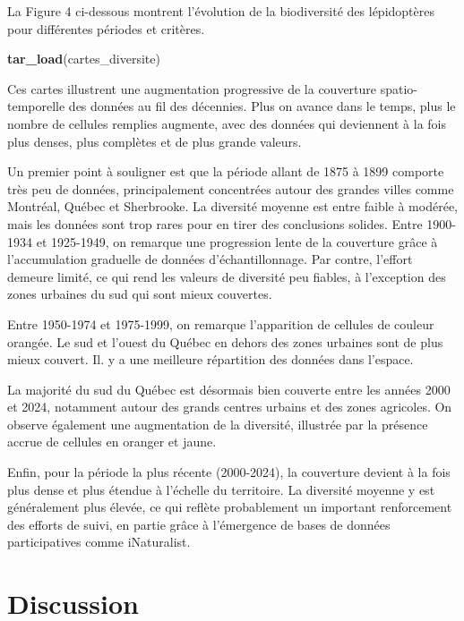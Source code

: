 \documentclass[9pt,twocolumn,twoside,]{pnas-new}
\newenvironment{Shaded}{\begin{snugshade}}{\end{snugshade}}
\newcommand{\FunctionTok}[1]{\textcolor[rgb]{0.13,0.29,0.53}{\textbf{#1}}}
\newcommand{\NormalTok}[1]{#1}
\begin{document}
La Figure 4 ci-dessous montrent l'évolution de la biodiversité des
lépidoptères pour différentes périodes et critères.

\begin{Shaded}
\begin{Highlighting}[]
\FunctionTok{tar\_load}\NormalTok{(cartes\_diversite)}
\end{Highlighting}
\end{Shaded}

Ces cartes illustrent une augmentation progressive de la couverture
spatio-temporelle des données au fil des décennies. Plus on avance dans
le temps, plus le nombre de cellules remplies augmente, avec des données
qui deviennent à la fois plus denses, plus complètes et de plus grande
valeurs.

Un premier point à souligner est que la période allant de 1875 à 1899
comporte très peu de données, principalement concentrées autour des
grandes villes comme Montréal, Québec et Sherbrooke. La diversité
moyenne est entre faible à modérée, mais les données sont trop rares
pour en tirer des conclusions solides. Entre 1900-1934 et 1925-1949, on
remarque une progression lente de la couverture grâce à l'accumulation
graduelle de données d'échantillonnage. Par contre, l'effort demeure
limité, ce qui rend les valeurs de diversité peu fiables, à l'exception
des zones urbaines du sud qui sont mieux couvertes.

Entre 1950-1974 et 1975-1999, on remarque l'apparition de cellules de
couleur orangée. Le sud et l'ouest du Québec en dehors des zones
urbaines sont de plus mieux couvert. Il. y a une meilleure répartition
des données dans l'espace.

La majorité du sud du Québec est désormais bien couverte entre les
années 2000 et 2024, notamment autour des grands centres urbains et des
zones agricoles. On observe également une augmentation de la diversité,
illustrée par la présence accrue de cellules en oranger et jaune.

Enfin, pour la période la plus récente (2000-2024), la couverture
devient à la fois plus dense et plus étendue à l'échelle du territoire.
La diversité moyenne y est généralement plus élevée, ce qui reflète
probablement un important renforcement des efforts de suivi, en partie
grâce à l'émergence de bases de données participatives comme
iNaturalist.

\section{Discussion}\label{discussion}
\end{document}
